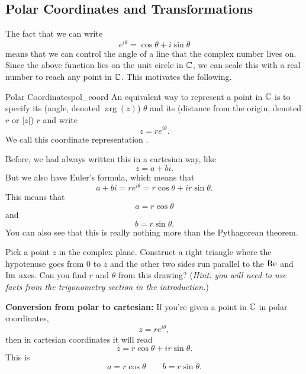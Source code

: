         \subsection{Polar Coordinates and Transformations}
        The fact that we can write
        \[
        e^{i\theta}= \cos \theta + i \sin \theta
        \]
        means that we can control the angle of a line that the complex number lives on.  Since the above function lies on the unit circle in $\mathbb{C}$, we can scale this with a real number to reach any point in $\mathbb{C}$. This motivates the following.

        \begin{df}{Polar Coordinates}{pol_coord}
        An equivalent way to represent a point in $\mathbb{C}$ is to specify its  (angle, denoted $\arg(z)$) $\theta$ and its  (distance from the origin, denoted $r$ or $|z|$) $r$ and write
        \[
        z=re^{i\theta}.
        \]
        We call this coordinate representation .
        \end{df}

        Before, we had always written this in a cartesian way, like
        \[
        z=a+bi.
        \]
        But we also have Euler's formula, which means that
        \[
        a+bi = re^{i\theta} = r\cos \theta + i r \sin \theta.
        \]
        This means that
        \[
        a=r\cos \theta
        \]
        and
        \[
        b = r \sin \theta.
        \]
        You can also see that this is really nothing more than the Pythagorean theorem.

        \begin{exercise}
            Pick a point $z$ in the complex plane. Construct a right triangle where the hypotenuse goes from $0$ to $z$ and the other two sides run parallel to the $\mathrm{Re}$ and $\mathrm{Im}$ axes. Can you find $r$ and $\theta$ from this drawing? (\emph{Hint: you will need to use facts from the trigonometry section in the introduction.})
        \end{exercise}



        \noindent \textbf{\textbf{Conversion from polar to cartesian:}} If you're given a point in $\mathbb{C}$ in polar coordinates,
        \[
        z=re^{i\theta},
        \]
        then in cartesian coordinates it will read
        \[
        z=r\cos \theta + ir\sin \theta.
        \]
        This is
        \[
        a=r\cos \theta \qquad b=r\sin \theta.
        \]

